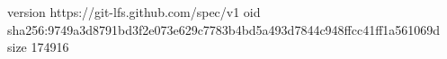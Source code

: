 version https://git-lfs.github.com/spec/v1
oid sha256:9749a3d8791bd3f2e073e629c7783b4bd5a493d7844c948ffcc41ff1a561069d
size 174916
